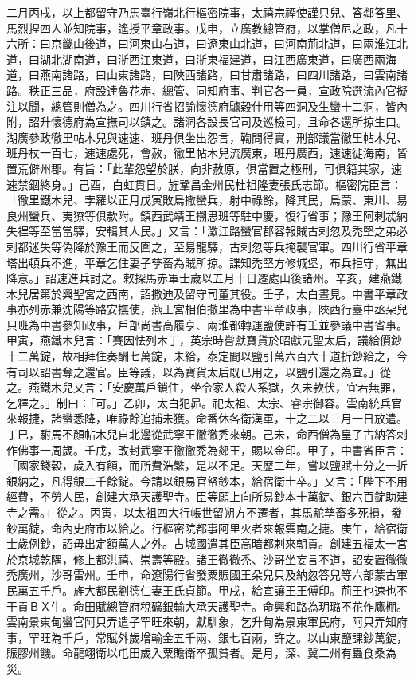 \begin{pinyinscope}
 二月丙戌，以上都留守乃馬臺行嶺北行樞密院事，太禧宗禋使謹只兒、答鄰答里、馬烈捏四人並知院事，遙授平章政事。戊申，立廣教總管府，以掌僧尼之政，凡十六所：曰京畿山後道，曰河東山右道，曰遼東山北道，曰河南荊北道，曰兩淮江北道，曰湖北湖南道，曰浙西江東道，曰浙東福建道，曰江西廣東道，曰廣西兩海道，曰燕南諸路，曰山東諸路，曰陜西諸路，曰甘肅諸路，曰四川諸路，曰雲南諸路。秩正三品，府設達魯花赤、總管、同知府事、判官各一員，宣政院選流內官擬注以聞，總管則僧為之。四川行省招諭懷德府驢穀什用等四洞及生蠻十二洞，皆內附，詔升懷德府為宣撫司以鎮之。諸洞各設長官司及巡檢司，且命各還所掠生口。湖廣參政徹里帖木兒與速速、班丹俱坐出怨言，鞫問得實，刑部議當徹里帖木兒、班丹杖一百七，速速處死，會赦，徹里帖木兒流廣東，班丹廣西，速速徙海南，皆置荒僻州郡。有旨：「此輩怨望於朕，向非赦原，俱當置之極刑，可俱籍其家，速速禁錮終身。」己酉，白虹貫日。旌鞏昌金州民杜祖隆妻張氏志節。樞密院臣言：「徹里鐵木兒、孛羅以正月戊寅敗烏撒蠻兵，射中祿餘，降其民，烏蒙、東川、易良州蠻兵、夷獠等俱款附。鎮西武靖王搠思班等駐中慶，復行省事；豫王阿剌忒納失裡等至當當驛，安輯其人民。」又言：「澂江路蠻官郡容報賊古剌忽及禿堅之弟必剌都迷失等偽降於豫王而反圍之，至易龍驛，古剌忽等兵掩襲官軍。四川行省平章塔出頓兵不進，平章乞住妻子孳畜為賊所掠。諜知禿堅方修城堡，布兵拒守，無出降意。」詔速進兵討之。敕探馬赤軍士歲以五月十日遷處山後諸州。辛亥，建燕鐵木兒居第於興聖宮之西南，詔撒迪及留守司董其役。壬子，太白晝見。中書平章政事亦列赤兼沈陽等路安撫使，燕王宮相伯撒里為中書平章政事，陜西行臺中丞朵兒只班為中書參知政事，戶部尚書高履亨、兩淮都轉運鹽使許有壬並參議中書省事。甲寅，燕鐵木兒言：「賽因怯列木丁，英宗時嘗獻寶貨於昭獻元聖太后，議給價鈔十二萬錠，故相拜住奏酬七萬錠，未給，泰定間以鹽引萬六百六十道折鈔給之，今有司以詔書奪之還官。臣等議，以為寶貨太后既已用之，以鹽引還之為宜。」從之。燕鐵木兒又言：「安慶萬戶鎖住，坐令家人殺人系獄，久未款伏，宜若無罪，乞釋之。」制曰：「可。」乙卯，太白犯昴。祀太祖、太宗、睿宗御容。雲南統兵官來報捷，諸蠻悉降，唯祿餘追捕未獲。命番休各衛漢軍，十之二以三月一日放遣。丁巳，駙馬不顏帖木兒自北邊從武寧王徹徹禿來朝。己未，命西僧為皇子古納答剌作佛事一周歲。壬戌，改封武寧王徹徹禿為郯王，賜以金印。甲子，中書省臣言：「國家錢穀，歲入有額，而所費浩繁，是以不足。天歷二年，嘗以鹽賦十分之一折銀納之，凡得銀二千餘錠。今請以銀易官帑鈔本，給宿衛士卒。」又言：「陛下不用經費，不勞人民，創建大承天護聖寺。臣等願上向所易鈔本十萬錠、銀六百錠助建寺之需。」從之。丙寅，以太祖四大行帳世留朔方不遷者，其馬駝孳畜多死損，發鈔萬錠，命內史府市以給之。行樞密院都事阿里火者來報雲南之捷。庚午，給宿衛士歲例鈔，詔毋出定額萬人之外。占城國遣其臣高暗都剌來朝貢。創建五福太一宮於京城乾隅，修上都洪禧、崇壽等殿。諸王徹徹禿、沙哥坐妄言不道，詔安置徹徹禿廣州，沙哥雷州。壬申，命遼陽行省發粟賑國王朵兒只及納忽答兒等六部蒙古軍民萬五千戶。旌大都民劉德仁妻王氏貞節。甲戌，給宣讓王王傅印。荊王也速也不干貢ＢＸ牛。命田賦總管府稅礦銀輸大承天護聖寺。命興和路為玥璐不花作鷹棚。雲南景東甸蠻官阿只弄遣子罕旺來朝，獻馴象，乞升甸為景東軍民府，阿只弄知府事，罕旺為千戶，常賦外歲增輸金五千兩、銀七百兩，許之。以山東鹽課鈔萬錠，賑膠州饑。命龍翊衛以屯田歲入粟贍衛卒孤貧者。是月，深、冀二州有蟲食桑為災。




\end{pinyinscope}
